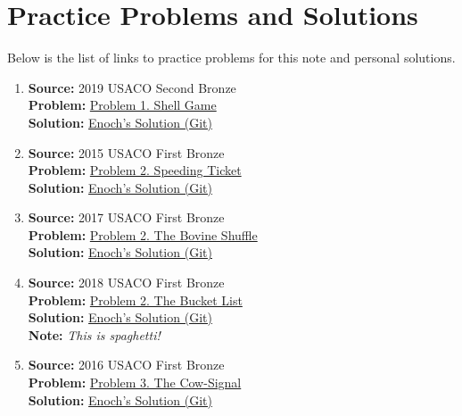\documentclass[../../../main.tex]{subfiles}
\begin{document}
\section{Practice Problems and Solutions}

Below is the list of links to practice problems for this note
and personal solutions.

\begin{enumerate}
\item
\textbf{Source:} 2019 USACO Second Bronze \\
\textbf{Problem:}
\href{https://usaco.org/index.php?page=viewproblem2&cpid=891}{Problem 1. Shell Game} \\
\textbf{Solution:}
\href{https://github.com/enochness/Archive/blob/main/B/cpp/B26121.cpp}{Enoch's Solution (Git)}

\item
\textbf{Source:} 2015 USACO First Bronze \\
\textbf{Problem:}
\href{https://usaco.org/index.php?page=viewproblem2&cpid=568}{Problem 2. Speeding Ticket} \\
\textbf{Solution:}
\href{https://github.com/enochness/Archive/blob/main/B/cpp/B26122.cpp}{Enoch's Solution (Git)}

\item
\textbf{Source:} 2017 USACO First Bronze \\
\textbf{Problem:}
\href{https://usaco.org/index.php?page=viewproblem2&cpid=760}{Problem 2. The Bovine Shuffle} \\
\textbf{Solution:}
\href{https://github.com/enochness/Archive/blob/main/B/cpp/B26123.cpp}{Enoch's Solution (Git)}

\item
\textbf{Source:} 2018 USACO First Bronze \\
\textbf{Problem:}
\href{https://usaco.org/index.php?page=viewproblem2&cpid=856}{Problem 2. The Bucket List} \\
\textbf{Solution:}
\href{https://github.com/enochness/Archive/blob/main/B/cpp/B26126.cpp}{Enoch's Solution (Git)} \\
\textbf{Note:} \textit{This is spaghetti!}

\item
\textbf{Source:} 2016 USACO First Bronze \\
\textbf{Problem:}
\href{https://usaco.org/index.php?page=viewproblem2&cpid=856}{Problem 3. The Cow-Signal} \\
\textbf{Solution:}
\href{https://github.com/enochness/Archive/blob/main/B/cpp/B26127.cpp}{Enoch's Solution (Git)}
\end{enumerate}
\end{document}
